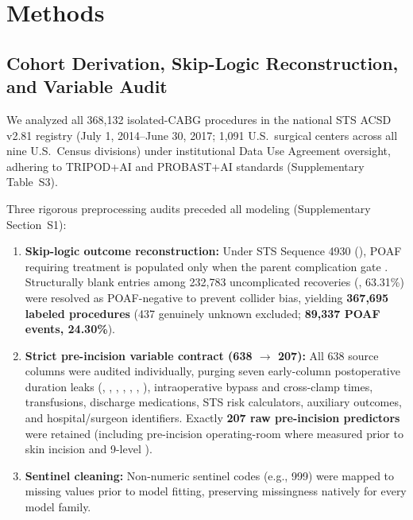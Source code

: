 \section{Methods}

\subsection{Cohort Derivation, Skip-Logic Reconstruction, and Variable Audit}
We analyzed all 368,132 isolated-CABG procedures in the national STS ACSD v2.81 registry (July 1, 2014--June 30, 2017; 1,091 U.S.\ surgical centers across all nine U.S.\ Census divisions) under institutional Data Use Agreement oversight, adhering to TRIPOD+AI and PROBAST+AI standards (Supplementary Table~S3).\cite{sts2014v281,collins2024tripodai,moons2025probastai}

Three rigorous preprocessing audits preceded all modeling (Supplementary Section~S1):
\begin{enumerate}
  \item \textbf{Skip-logic outcome reconstruction:} Under STS Sequence 4930 (), POAF requiring treatment is populated only when the parent complication gate . Structurally blank entries among 232,783 uncomplicated recoveries (, 63.31\%) were resolved as POAF-negative to prevent collider bias,\cite{hernan2020causal} yielding \textbf{367,695 labeled procedures} (437 genuinely unknown excluded; \textbf{89,337 POAF events, 24.30\%}).
  \item \textbf{Strict pre-incision variable contract (638 $\to$ 207):} All 638 source columns were audited individually, purging seven early-column postoperative duration leaks (, , , , , , ), intraoperative bypass and cross-clamp times, transfusions, discharge medications, STS risk calculators, auxiliary outcomes, and hospital/surgeon identifiers. Exactly \textbf{207 raw pre-incision predictors} were retained (including pre-incision operating-room  where measured prior to skin incision and 9-level ).
  \item \textbf{Sentinel cleaning:} Non-numeric sentinel codes (e.g., 999) were mapped to missing values prior to model fitting, preserving missingness natively for every model family.
\end{enumerate}

